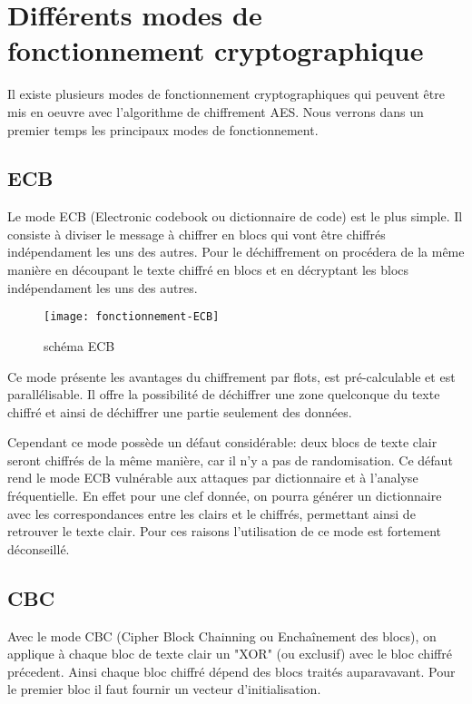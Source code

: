 \chapter{Différents modes de fonctionnement cryptographique}
\label{chap:différents modes}

Il existe plusieurs modes de fonctionnement cryptographiques qui peuvent être mis en oeuvre avec l'algorithme de chiffrement AES. Nous verrons dans un premier temps les principaux modes de fonctionnement.

\section{ECB}

Le mode ECB (Electronic codebook ou dictionnaire de code) est le plus simple. Il consiste à diviser le message à chiffrer en blocs qui vont être chiffrés indépendament les uns des autres. Pour le déchiffrement on procédera de la même manière en découpant le texte chiffré en blocs et en décryptant les blocs indépendament les uns des autres.

\begin{figure}[!h]
  \centering
  \texttt{[image: fonctionnement-ECB]}
  \caption{schéma ECB \cite{wiki}}
  \label{schema ECB}
\end{figure}

Ce mode présente les avantages du chiffrement par flots, est pré-calculable et est parallélisable. Il offre la possibilité de déchiffrer une zone quelconque du texte chiffré et ainsi de déchiffrer une partie seulement des données.

Cependant ce mode possède un défaut considérable: deux blocs de texte clair seront chiffrés de la même manière, car il n'y a pas de randomisation. Ce défaut rend le mode ECB vulnérable aux attaques par dictionnaire et à l'analyse fréquentielle. En effet pour une clef donnée, on pourra générer un dictionnaire avec les correspondances entre les clairs et le chiffrés, permettant ainsi de retrouver le texte clair. Pour ces raisons l'utilisation de ce mode est fortement déconseillé.

\section{CBC}

Avec le mode CBC (Cipher Block Chainning ou Enchaînement des blocs), on applique à chaque bloc de texte clair un "XOR" (ou exclusif) avec le bloc chiffré précedent. Ainsi chaque bloc chiffré dépend des blocs traités auparavavant. Pour le premier bloc il faut fournir un vecteur d'initialisation.

